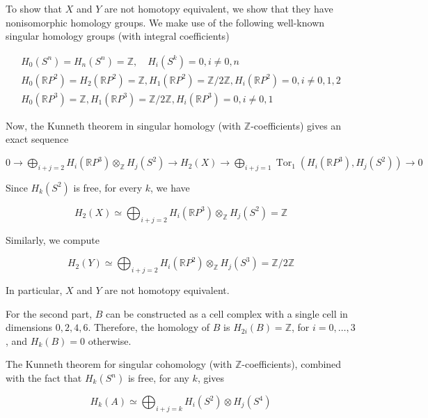 \documentclass[10pt]{article}
\begin{document}
To show that $X$ and $Y$ are not homotopy equivalent, we show that they have nonisomorphic homology groups. We make use of the following well-known singular homology groups (with integral coefficients)

$$
\begin{gathered}
H_{0}\left(S^{n}\right)=H_{n}\left(S^{n}\right)=\mathbb{Z}, \quad H_{i}\left(S^{k}\right)=0, i \neq 0, n \\
H_{0}\left(\mathbb{R} P^{2}\right)=H_{2}\left(\mathbb{R} P^{2}\right)=\mathbb{Z}, H_{1}\left(\mathbb{R} P^{2}\right)=\mathbb{Z} / 2 \mathbb{Z}, H_{i}\left(\mathbb{R} P^{2}\right)=0, i \neq 0,1,2 \\
H_{0}\left(\mathbb{R} P^{3}\right)=\mathbb{Z}, H_{1}\left(\mathbb{R} P^{3}\right)=\mathbb{Z} / 2 \mathbb{Z}, H_{i}\left(\mathbb{R} P^{3}\right)=0, i \neq 0,1
\end{gathered}
$$

Now, the Kunneth theorem in singular homology (with $\mathbb{Z}$-coefficients) gives an exact sequence

$0 \rightarrow \bigoplus_{i+j=2} H_{i}\left(\mathbb{R} P^{3}\right) \otimes_{\mathbb{Z}} H_{j}\left(S^{2}\right) \rightarrow H_{2}(X) \rightarrow \bigoplus_{i+j=1} \operatorname{Tor}_{1}\left(H_{i}\left(\mathbb{R} P^{3}\right), H_{j}\left(S^{2}\right)\right) \rightarrow 0$

Since $H_{k}\left(S^{2}\right)$ is free, for every $k$, we have

$$
H_{2}(X) \simeq \bigoplus_{i+j=2} H_{i}\left(\mathbb{R} P^{3}\right) \otimes_{\mathbb{Z}} H_{j}\left(S^{2}\right)=\mathbb{Z}
$$

Similarly, we compute

$$
H_{2}(Y) \simeq \bigoplus_{i+j=2} H_{i}\left(\mathbb{R} P^{2}\right) \otimes_{\mathbb{Z}} H_{j}\left(S^{3}\right)=\mathbb{Z} / 2 \mathbb{Z}
$$

In particular, $X$ and $Y$ are not homotopy equivalent.

For the second part, $B$ can be constructed as a cell complex with a single cell in dimensions $0,2,4,6$. Therefore, the homology of $B$ is $H_{2 i}(B)=\mathbb{Z}$, for $i=0, \ldots, 3$, and $H_{k}(B)=0$ otherwise.

The Kunneth theorem for singular cohomology (with $\mathbb{Z}$-coefficients), combined with the fact that $H_{k}\left(S^{n}\right)$ is free, for any $k$, gives

$$
H_{k}(A) \simeq \bigoplus_{i+j=k} H_{i}\left(S^{2}\right) \otimes H_{j}\left(S^{4}\right)
$$
\end{document}
